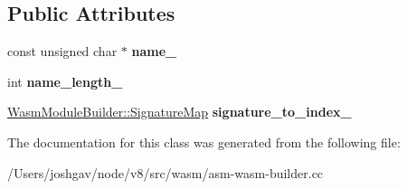 \subsection*{Public Attributes}
\begin{DoxyCompactItemize}
\item 
const unsigned char $\ast$ {\bfseries name\+\_\+}\hypertarget{classv8_1_1internal_1_1wasm_1_1_asm_wasm_builder_impl_1_1_imported_function_table_1_1_imported_function_indices_a5581669a448166a6024712bd08dd480d}{}\label{classv8_1_1internal_1_1wasm_1_1_asm_wasm_builder_impl_1_1_imported_function_table_1_1_imported_function_indices_a5581669a448166a6024712bd08dd480d}

\item 
int {\bfseries name\+\_\+length\+\_\+}\hypertarget{classv8_1_1internal_1_1wasm_1_1_asm_wasm_builder_impl_1_1_imported_function_table_1_1_imported_function_indices_ac051196751ea9e2e0dcb04316d891358}{}\label{classv8_1_1internal_1_1wasm_1_1_asm_wasm_builder_impl_1_1_imported_function_table_1_1_imported_function_indices_ac051196751ea9e2e0dcb04316d891358}

\item 
\hyperlink{classv8_1_1internal_1_1_zone_map}{Wasm\+Module\+Builder\+::\+Signature\+Map} {\bfseries signature\+\_\+to\+\_\+index\+\_\+}\hypertarget{classv8_1_1internal_1_1wasm_1_1_asm_wasm_builder_impl_1_1_imported_function_table_1_1_imported_function_indices_a2ff9e0ed8c6372841b268e51eb06f848}{}\label{classv8_1_1internal_1_1wasm_1_1_asm_wasm_builder_impl_1_1_imported_function_table_1_1_imported_function_indices_a2ff9e0ed8c6372841b268e51eb06f848}

\end{DoxyCompactItemize}


The documentation for this class was generated from the following file\+:\begin{DoxyCompactItemize}
\item 
/\+Users/joshgav/node/v8/src/wasm/asm-\/wasm-\/builder.\+cc\end{DoxyCompactItemize}
